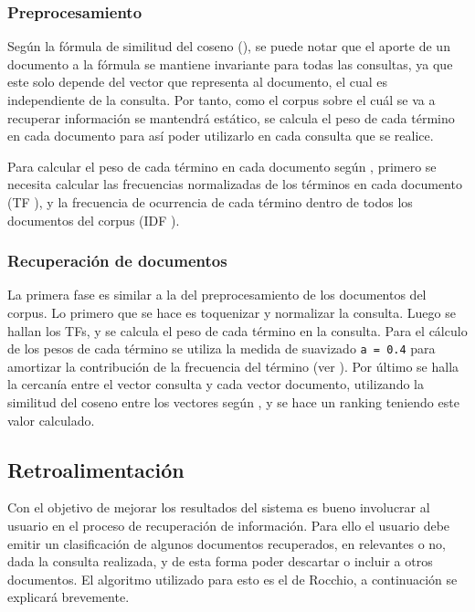 \documentclass{llncs}
\begin{document}
    \subsubsection{Preprocesamiento}
	
	Seg\'un la f\'ormula de similitud del coseno (\cite[\emph{Ecuaci\'on}~(6.10)]{B1}), se puede notar que el aporte de un documento a la f\'ormula se mantiene invariante para todas las consultas, ya que este solo depende del vector que representa al documento, el cual es independiente de la consulta. Por tanto, como el corpus sobre el cu\'al se va a recuperar informaci\'on se mantendr\'a est\'atico, se calcula el peso de cada t\'ermino en cada documento para as\'i poder utilizarlo en cada consulta que se realice.
	
	Para calcular el peso de cada t\'ermino en cada documento seg\'un \cite[Ecuaci\'on (2.3)]{B1}, primero se necesita calcular las frecuencias normalizadas de los t\'erminos en cada documento (TF \cite[Ecuaci\'on (2.1)]{B2}), y la frecuencia de ocurrencia de cada t\'ermino dentro de todos los documentos del corpus (IDF \cite[Ecuaci\'on(2.2)]{B2}).
	
	\subsubsection{Recuperación de documentos}
	
	La primera fase es similar a la del preprocesamiento de los documentos del corpus. Lo primero que se hace es toquenizar y normalizar la consulta. Luego se hallan los TFs, y se calcula el peso de cada t\'ermino en la consulta. Para el c\'alculo de los pesos de cada t\'ermino  se utiliza la medida de suavizado \texttt{a = 0.4} para amortizar la contribuci\'on de la frecuencia del t\'ermino (ver \cite[ecuaci\'on (2.4)]{B2}). Por \'ultimo se halla la cercan\'ia entre el vector consulta y cada vector documento, utilizando la similitud del coseno entre los vectores seg\'un \cite[Ecuaci\'on 6.10]{B1}, y se hace un ranking teniendo este valor calculado.

    \subsection{Retroalimentaci\'on}

    Con el objetivo de mejorar los resultados del sistema es bueno involucrar al usuario en el proceso de recuperación de información. Para ello el usuario debe emitir un clasificación de algunos documentos recuperados, en relevantes o no, dada la consulta realizada, y de esta forma poder descartar o incluir a otros documentos. El algoritmo utilizado para esto es el de Rocchio, a continuación se explicará brevemente.
\end{document}
